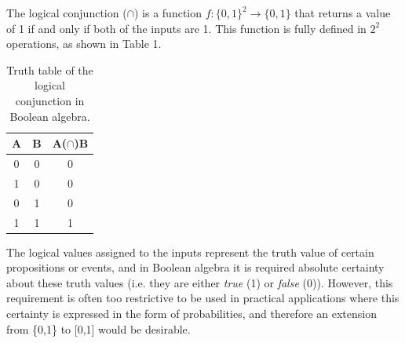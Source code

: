 \documentclass[runningheads]{llncs}
\begin{document}
The logical conjunction ($\cap$) is a function $f:\{0,1\}^2 \rightarrow{\{0,1\}}$ that returns a value of 1 if and only if
both of the inputs are 1.
This function is fully defined in $2^2$ operations, as shown in Table 1.
%
\begin{table}
\centering
\caption{Truth table of the logical conjunction in Boolean algebra.}\label{tab1}
\begin{tabular}{|c|c|c|}
\hline
\textbf{A} & \textbf{B} & \textbf{A($\cap$)B} \\ \hline
0 & 0 & 0 \\ \hline
1 & 0 & 0 \\ \hline
0 & 1 & 0 \\ \hline
1 & 1 & 1 \\ \hline
\end{tabular}
\end{table}
%
\noindent The logical values assigned to the inputs represent the truth value of certain propositions or events, and in Boolean algebra it
is required absolute certainty about these truth values (i.e. they are either \textit{true} (1) or \textit{false} (0)).
However, this requirement is often too restrictive to be used in practical applications where this certainty is expressed in the
form of probabilities, and therefore an extension from \{0,1\} to [0,1] would be desirable.
\end{document}
